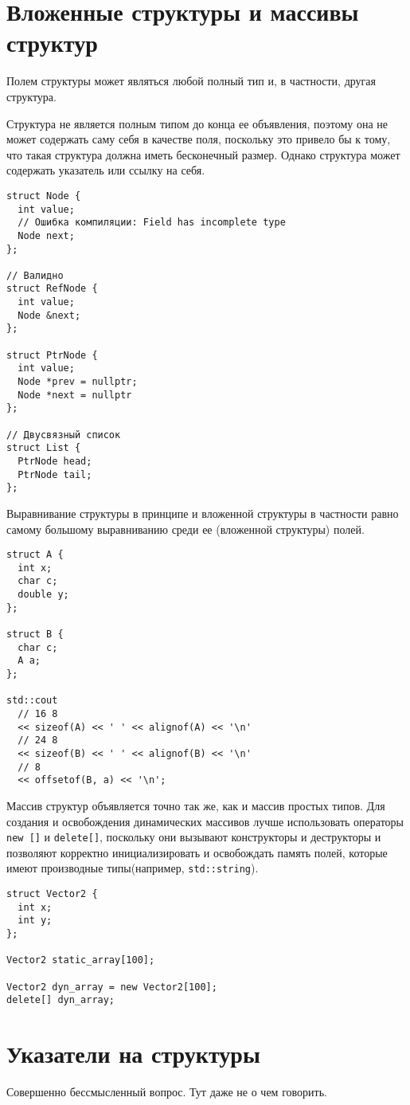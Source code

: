 \section{Вложенные структуры и массивы структур}
Полем структуры может являться любой полный тип и, в частности, другая структура.

Структура не является полным типом до конца ее объявления, поэтому она не может
содержать саму себя в качестве поля, поскольку это привело бы к тому, что такая
структура должна иметь бесконечный размер. Однако структура может содержать
указатель или ссылку на себя.

\begin{verbatim}
struct Node {
  int value;
  // Ошибка компиляции: Field has incomplete type
  Node next;
};

// Валидно
struct RefNode {
  int value;
  Node &next;
};

struct PtrNode {
  int value;
  Node *prev = nullptr;
  Node *next = nullptr
};

// Двусвязный список
struct List {
  PtrNode head;
  PtrNode tail;
};
\end{verbatim}

Выравнивание структуры в принципе и вложенной структуры в частности равно самому
большому выравниванию среди ее (вложенной структуры) полей.
\begin{verbatim}
struct A {
  int x;
  char c;
  double y;
};

struct B {
  char c;
  A a;
};

std::cout
  // 16 8
  << sizeof(A) << ' ' << alignof(A) << '\n'
  // 24 8
  << sizeof(B) << ' ' << alignof(B) << '\n'
  // 8
  << offsetof(B, a) << '\n';

\end{verbatim}

Массив структур объявляется точно так же, как и массив простых типов.
Для создания и освобождения динамических массивов лучше использовать
операторы \verb|new []| и \verb|delete[]|, поскольку они вызывают
конструкторы и деструкторы и позволяют корректно инициализировать и
освобождать память полей, которые имеют производные типы(например,
\verb|std::string|).
\begin{verbatim}
struct Vector2 {
  int x;
  int y;
};

Vector2 static_array[100];

Vector2 dyn_array = new Vector2[100];
delete[] dyn_array;
\end{verbatim}

\section{Указатели на структуры}
Совершенно бессмысленный вопрос. Тут даже не о чем говорить.

